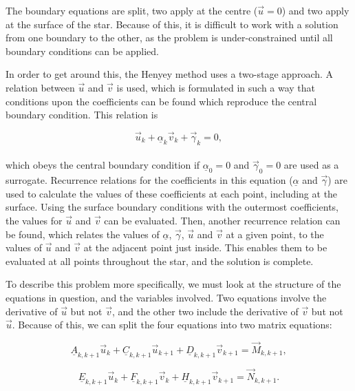 \documentclass[11pt]{amsart}
\begin{document}
The boundary equations are split, two apply at the centre ($\vec{u} = 0$) and two apply at the surface of the star.  Because of this, it is difficult to work with a solution from one boundary to the other, as the problem is under-constrained until all boundary conditions can be applied.

In order to get around this, the Henyey method uses a two-stage approach.  A relation between $\vec{u}$ and $\vec{v}$ is used, which is formulated in such a way that conditions upon the coefficients can be found which reproduce the central boundary condition.  This relation is

\begin{equation} \label{eq:relation}
\vec{u}_{k}  + \underline{\alpha}_{k}  \vec{v}_{k}  + \vec{\gamma}_{k}  = 0,
\end{equation}
\\
which obeys the central boundary condition if $\underline{\alpha}_{0} = 0$ and $\vec{\gamma}_{0} = 0$ are used as a surrogate.  Recurrence relations for the coefficients in this equation ($\underline{\alpha}$ and $\vec{\gamma}$) are used to calculate the values of these coefficients at each point, including at the surface.  Using the surface boundary conditions with the outermost coefficients, the values for $\vec{u}$ and $\vec{v}$ can be evaluated.  Then, another recurrence relation can be found, which relates the values of $\underline{\alpha}$, $\vec{\gamma}$, $\vec{u}$ and $\vec{v}$ at a given point, to the values of $\vec{u}$ and $\vec{v}$ at the adjacent point just inside.  This enables them to be evaluated at all points throughout the star, and the solution is complete.

To describe this problem more specifically, we must look at the structure of the equations in question, and the variables involved.  Two equations involve the derivative of $\vec{u}$ but not $\vec{v}$, and the other two include the derivative of $\vec{v}$ but not $\vec{u}$.  Because of this, we can split the four equations into two matrix equations:

\begin{equation} \label{eq:ACD}
\underline{A}_{k,k+1} \vec{u}_{k} + \underline{C}_{k,k+1} \vec{u}_{k+1} + \underline{D}_{k,k+1} \vec{v}_{k+1} = \vec{M}_{k,k+1},
\end{equation} 

\begin{equation} \label{eq:EFH}
\underline{E}_{k,k+1} \vec{u}_{k} + \underline{F}_{k,k+1} \vec{v}_{k} + \underline{H}_{k,k+1} \vec{v}_{k+1} = \vec{N}_{k,k+1}.
\end{equation} 
\\
\end{document}
